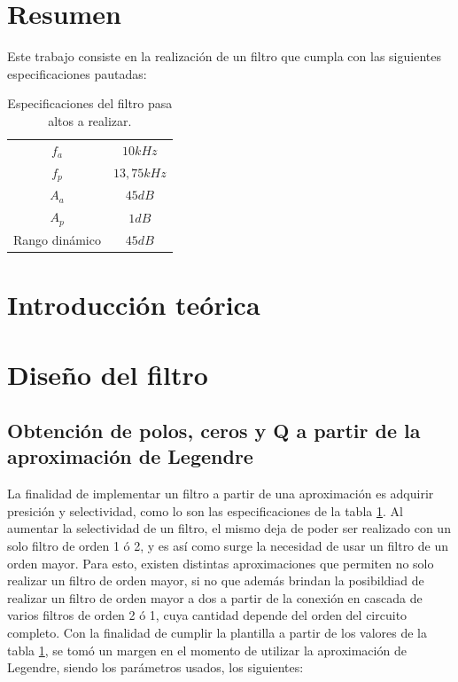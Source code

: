 \section{Resumen}

Este trabajo consiste en la realizaci\'on de un filtro que cumpla con las siguientes especificaciones pautadas:

	\begin{table}[H]
	\centering
	\begin{tabular}{c c}
		\hline
		$f_a$ & $10kHz$\\
		$f_p$ & $13,75kHz$\\
		$A_a$ & $45dB$\\
		$A_p$ & $1dB$\\
		Rango din\'amico & $45dB$\\	
		\hline
	\end{tabular}
	\caption{Especificaciones del filtro pasa altos a realizar.}
	\label{especificaciones}
\end{table}

\section{Introducci\'on te\'orica}

\section{Dise\~no del filtro}

\subsection{Obtenci\'on de polos, ceros y Q a partir de la aproximaci\'on de Legendre}

La finalidad de implementar un filtro a partir de una aproximaci\'on es adquirir presici\'on y selectividad, como lo son las especificaciones de la tabla \ref{especificaciones}. Al aumentar la selectividad de un filtro, el mismo deja de poder ser realizado con un solo filtro de orden 1 \'o 2, y es as\'i como surge la necesidad de usar un filtro de un orden mayor. Para esto, existen distintas aproximaciones que permiten no solo realizar un filtro de orden mayor, si no que adem\'as brindan la posibildiad de realizar un filtro de orden mayor a dos a partir de la conexi\'on en cascada de varios filtros de orden 2 \'o 1, cuya cantidad depende del orden del circuito completo. Con la finalidad de cumplir la plantilla a partir de los valores de la tabla \ref{especificaciones}, se tom\'o un margen en el momento de utilizar la aproximaci\'on de Legendre, siendo los par\'ametros usados, los siguientes:

